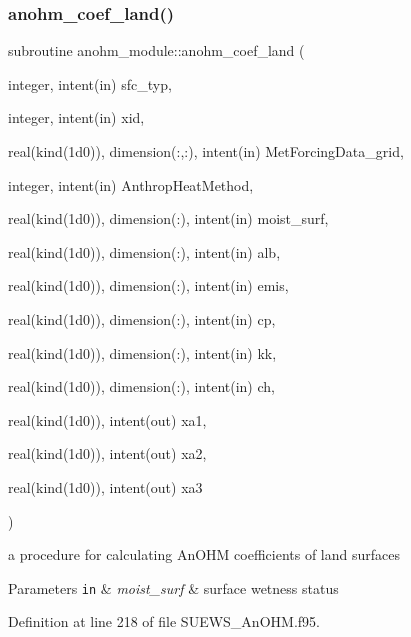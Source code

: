 \subsubsection{\texorpdfstring{anohm\+\_\+coef\+\_\+land()}{anohm\_coef\_land()}}
{\footnotesize\ttfamily subroutine anohm\+\_\+module\+::anohm\+\_\+coef\+\_\+land (\begin{DoxyParamCaption}\item[{integer, intent(in)}]{sfc\+\_\+typ,  }\item[{integer, intent(in)}]{xid,  }\item[{real(kind(1d0)), dimension(\+:,\+:), intent(in)}]{Met\+Forcing\+Data\+\_\+grid,  }\item[{integer, intent(in)}]{Anthrop\+Heat\+Method,  }\item[{real(kind(1d0)), dimension(\+:), intent(in)}]{moist\+\_\+surf,  }\item[{real(kind(1d0)), dimension(\+:), intent(in)}]{alb,  }\item[{real(kind(1d0)), dimension(\+:), intent(in)}]{emis,  }\item[{real(kind(1d0)), dimension(\+:), intent(in)}]{cp,  }\item[{real(kind(1d0)), dimension(\+:), intent(in)}]{kk,  }\item[{real(kind(1d0)), dimension(\+:), intent(in)}]{ch,  }\item[{real(kind(1d0)), intent(out)}]{xa1,  }\item[{real(kind(1d0)), intent(out)}]{xa2,  }\item[{real(kind(1d0)), intent(out)}]{xa3 }\end{DoxyParamCaption})}



a procedure for calculating An\+O\+HM coefficients of land surfaces 


\begin{DoxyParams}[1]{Parameters}
\mbox{\tt in}  & {\em moist\+\_\+surf} & surface wetness status \\
\hline
\end{DoxyParams}


Definition at line 218 of file S\+U\+E\+W\+S\+\_\+\+An\+O\+H\+M.\+f95.

